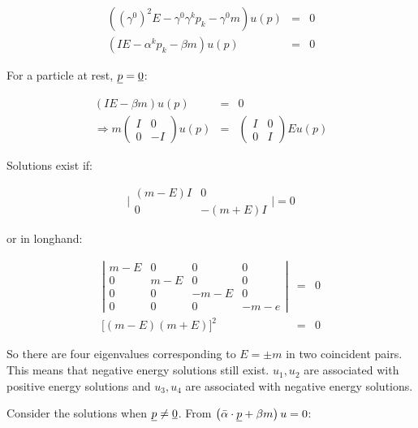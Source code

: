 \begin{eqnarray*}
  \left(\left(\gamma^0\right)^2E - \gamma^0\gamma^kp_k - \gamma^0m\right)u(p) & = & 0 \\
  \left(IE - \alpha^kp_k -\beta m\right) u(p) & = & 0
\end{eqnarray*}

For a particle at rest, $\underline{p} = \underline{0}$:

\begin{eqnarray*}
  \left(IE - \beta m\right)u(p) & = & 0 \\
  \Rightarrow m
  \left(
    \begin{array}{cc}
    I & 0 \\
    0 & -I
    \end{array}
  \right)
  u(p)
  & = & 
  \left(
    \begin{array}{cc}
    I & 0 \\
    0 & I
    \end{array}
  \right)
  Eu(p)
\end{eqnarray*}

Solutions exist if:

\[
  \Bigg|
    \begin{array}{cc}
    (m - E)I & 0 \\
    0 & -(m + E)I
    \end{array}
  \Bigg|
  = 0
\]

or in longhand:

\begin{eqnarray*}
  \left|
    \begin{array}{cccc}
    m-E & 0 & 0 & 0  \\
    0 & m-E & 0 & 0  \\
    0 & 0 & -m-E & 0 \\
    0 & 0 & 0 & -m-e
    \end{array}
  \right|
  & = & 0 \\
  \Big[\left(m-E\right)\left(m+E\right)\Big]^2 & = & 0
\end{eqnarray*}

So there are four eigenvalues corresponding to $E = \pm m$ in two coincident pairs.  This means that negative energy solutions still exist.  $u_1, u_2$ are associated with positive energy solutions and $u_3, u_4$ are associated with negative energy solutions.

Consider the solutions when $\underline{p} \neq \underline{0}$.  From $\left(\bar{\alpha}\cdot\underline{p} + \beta m\right)u = 0$:

